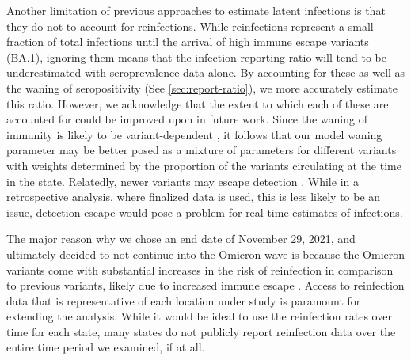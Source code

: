 Another limitation of previous approaches to estimate latent infections is that
they do not to account for reinfections. While reinfections represent a small
fraction of total infections until the arrival of high immune escape variants (BA.1), 
ignoring them means
that the infection-reporting ratio will tend to be underestimated with
seroprevalence data alone. By accounting for these as well as the waning of
seropositivity (See \autoref{sec:report-ratio}), we more accurately estimate
this ratio.
However, we acknowledge that the extent to which each of these are accounted for
could be improved upon in future work. Since the waning of immunity is likely to
be variant-dependent \citep{pooley2023durability}, it follows that our model
waning parameter may be better posed as a mixture of parameters for different
variants with weights determined by the proportion of the variants circulating
at the time in the state. Relatedly, newer variants may escape detection
\citep{nih2022assessing, fda2023sars}. While in a retrospective analysis, where
finalized data is used, this is less likely to be an issue, detection escape
would pose a problem for real-time estimates of infections.

The major reason why we chose an end date of November 29,
2021, and ultimately decided to not continue into the Omicron wave is because
the Omicron variants come with substantial increases in the risk of reinfection
in comparison to previous variants, likely due to increased immune escape
\citep{wei2024risk, pulliam2022increased, eythorsson2022rate}. Access to
reinfection data that is representative of each location under study is paramount
for extending the analysis. While it would be ideal to use the reinfection rates
over time for each \US state, many states do not publicly report reinfection
data over the entire time period we examined, if at all.



